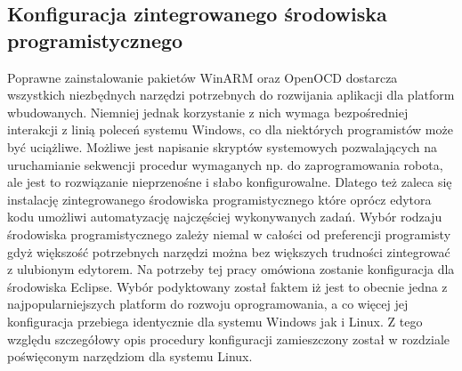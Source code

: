 \subsection{Konfiguracja zintegrowanego środowiska programistycznego}
Poprawne zainstalowanie pakietów WinARM oraz OpenOCD dostarcza wszystkich
niezbędnych narzędzi potrzebnych do rozwijania aplikacji dla platform
wbudowanych. Niemniej jednak korzystanie z nich wymaga bezpośredniej interakcji
z linią poleceń systemu Windows, co dla niektórych programistów może być
uciążliwe. Możliwe jest napisanie skryptów systemowych pozwalających na
uruchamianie sekwencji procedur wymaganych np. do zaprogramowania robota,
ale jest to rozwiązanie nieprzenośne i słabo konfigurowalne. Dlatego też zaleca
się instalację zintegrowanego środowiska programistycznego które oprócz edytora
kodu umożliwi automatyzację najczęściej wykonywanych zadań. Wybór rodzaju
środowiska programistycznego zależy niemal w całości od preferencji programisty
gdyż większość potrzebnych narzędzi można bez większych trudności zintegrować z
ulubionym edytorem. Na potrzeby tej pracy omówiona zostanie konfiguracja dla
środowiska Eclipse. Wybór podyktowany został faktem iż jest to obecnie jedna z
najpopularniejszych platform do rozwoju oprogramowania, a co więcej jej
konfiguracja przebiega identycznie dla systemu Windows jak i Linux. Z tego
względu szczegółowy opis procedury konfiguracji zamieszczony został w rozdziale
poświęconym narzędziom dla systemu Linux.
